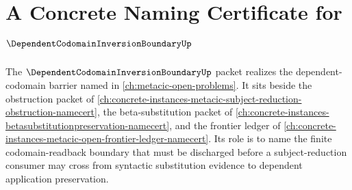 \chapter{A Concrete Naming Certificate for $\DependentCodomainInversionBoundaryUp$}
\label{ch:concrete-instances-dependentcodomaininversionboundary-namecert}

The $\DependentCodomainInversionBoundaryUp$ packet realizes the dependent-codomain barrier named in \autoref{ch:metacic-open-problems}. It sits beside the obstruction packet of \autoref{ch:concrete-instances-metacic-subject-reduction-obstruction-namecert}, the beta-substitution packet of \autoref{ch:concrete-instances-betasubstitutionpreservation-namecert}, and the frontier ledger of \autoref{ch:concrete-instances-metacic-open-frontier-ledger-namecert}. Its role is to name the finite codomain-readback boundary that must be discharged before a subject-reduction consumer may cross from syntactic substitution evidence to dependent application preservation.


